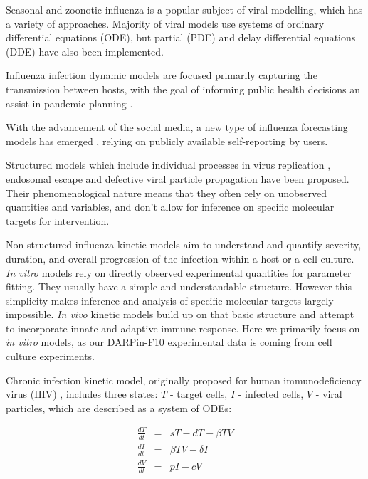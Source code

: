 Seasonal and zoonotic influenza is a popular subject of viral modelling, which has a variety of approaches. Majority of viral models use systems of ordinary differential equations (ODE), but partial (PDE) and delay differential equations (DDE) have also been implemented.

Influenza infection dynamic models are focused primarily capturing the transmission between hosts, with the goal of informing public health decisions an assist in pandemic planning \cite{ferguson2006strategies, mcvernon2007model}.

With the advancement of the social media, a new type of influenza forecasting models has emerged \cite{pawelek2014modeling, santillana2015combining, levy2018modeling}, relying on publicly available self-reporting by users.

Structured models which include individual processes in virus replication \cite{sidorenko2004structured}, endosomal escape \cite{lagache2012modeling} and defective viral particle propagation \cite{rudiger2019multiscale} have been proposed. Their phenomenological nature means that they often rely on unobserved quantities and variables, and don't allow for inference on specific molecular targets for intervention.

Non-structured influenza kinetic models aim to understand and quantify severity, duration, and overall progression of the infection within a host or a cell culture. \textit{In vitro} models rely on directly observed experimental quantities for parameter fitting. They usually have a simple and understandable structure. However this simplicity makes inference and analysis of specific molecular targets largely impossible. \textit{In vivo} kinetic models build up on that basic structure and attempt to incorporate innate \cite{beauchemin2008modeling, handel2010towards,miao2010quantifying} and adaptive \cite{belz2002compromised, handel2010towards, miao2010quantifying} immune response. Here we primarily focus on \textit{in vitro} models, as our DARPin-F10 experimental data is coming from cell culture experiments.

Chronic infection kinetic model, originally proposed for human immunodeficiency virus (HIV) \cite{perelson2002modelling}, includes three states: $T$ - target cells, $I$ - infected cells, $V$ - viral particles, which are described as a system of ODEs:

\begin{equation}
\begin{array}{rcl}
\frac{dT}{dt} &=& s T - d T - \beta T V \\
\frac{dI}{dt} &=& \beta T V - \delta I \\
\frac{dV}{dt} &=& p I - c V
\end{array}
\end{equation}

